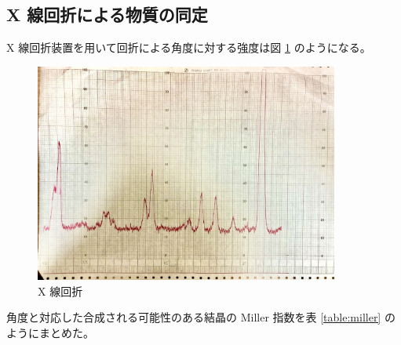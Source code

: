 \documentclass[uplatex,dvipdfmx,a4paper,11pt]{jlreq}
\numberwithin{equation}{section}
\theoremstyle{definition}
\begin{document}
\subsection{X 線回折による物質の同定}
X 線回折装置を用いて回折による角度に対する強度は図 \ref{fig:xray} のようになる。
\begin{figure}[htbp]
  \centering
  \includegraphics[width=10cm]{./assets/YBCO_xray.jpg}
  \caption{X 線回折}
  \label{fig:xray}
\end{figure}

角度と対応した合成される可能性のある結晶の Miller 指数を表 \ref{table:miller} のようにまとめた。
\end{document}
